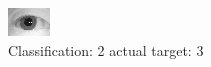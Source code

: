 \begin{figure}[h!]
\begin{center}
\includegraphics[width=0.60\columnwidth]{figures/ID1206_class_2_target_3.png}
\end{center}
\caption{ Classification: 2 actual target: 3}
\label{fig:ID1206_class_2_target_3}
\end{figure}
